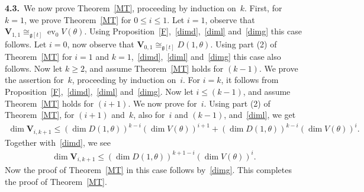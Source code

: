 \documentclass[11pt]{article}
\DeclareMathOperator{\ev}{ev}
\numberwithin{equation}{section}
\begin{document}
{\bf 4.3.}~We now prove Theorem~\ref{MT}, proceeding by induction on~$k$.
First, for $k=1$, we prove Theorem~\ref{MT} for $0\leq i \leq 1$.
Let $i=1$, observe that $\mathbf{V}_{1,1} \cong_{\mathfrak{g}[t]} \ev_{0} V(\theta)$.
Using Proposition~\ref{F},~\eqref{dimd},~\eqref{diml} and~\eqref{dimg} this case follows.
Let $i=0$, now observe that $\mathbf{V}_{0,1} \cong_{\mathfrak{g}[t]} D(1,\theta)$.
Using part (2) of Theorem~\ref{MT} for $i=1$ and $k=1$,~\eqref{dimd},~\eqref{diml} and~\eqref{dimg} this case also
follows.
Now let $k\geq2$, and assume Theorem~\ref{MT} holds for $(k-1)$.
We prove the assertion for~$k$, proceeding by induction on~$i$.
For $i=k$, it follows from Proposition~\ref{F},~\eqref{dimd},~\eqref{diml} and~\eqref{dimg}.
Now let $i\leq (k-1)$, and assume Theorem~\ref{MT} holds for $(i+1)$.
We now prove for~$i$.
Using part (2) of Theorem~\ref{MT}, for $(i+1)$ and~$k$, also for~$i$ and $(k-1)$, and~\eqref{diml}, we get
\begin{gather*}
\dim \mathbf{V}_{i,k+1} \leq (\dim D(1, \theta))^{k-i} (\dim V(\theta))^{i+1} + (\dim D(1, \theta))^{k-i}
(\dim V(\theta))^{i}.
\end{gather*}
Together with~\eqref{dimd}, we see
\begin{gather*}
\dim \mathbf{V}_{i,k+1} \leq (\dim D(1,\theta))^{k+1-i} (\dim V(\theta))^{i}.
\end{gather*}
Now the proof of Theorem~\ref{MT} in this case follows by~\eqref{dimg}.
This completes the proof of Theorem~\ref{MT}.
\end{document}
